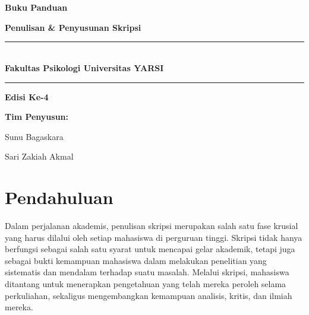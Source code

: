 \documentclass[
  indonesian,
  letterpaper,
  DIV=11,
  numbers=noendperiod]{scrreprt}
\author{}
\date{}
\renewcommand*\contentsname{Daftar Isi}
\newcommand\contentsname{Daftar Isi}
\begin{document}
\renewcommand*\contentsname{Daftar Isi}
{
\hypersetup{linkcolor=}
\setcounter{tocdepth}{2}
\tableofcontents
}


\chapter{}\label{section}


\chapter{}\label{section-1}

\begin{titlepage}
\centering
\vspace*{2.5cm}

{\fontsize{22pt}{26pt}\selectfont\bfseries\color{titleaccent} Buku Panduan\\[2mm]}
{\fontsize{18pt}{22pt}\selectfont\bfseries Penulisan \& Penyusunan Skripsi\par}

\vspace{1.4cm}
\rule{\linewidth}{0.5pt}\\[-1pt]
{\large \textbf{Fakultas Psikologi Universitas YARSI}}\par
\rule{\linewidth}{0.5pt}

\vspace{1.6cm}
{\large \textbf{Edisi Ke-4}\par}

\vfill

{\large \textbf{Tim Penyusun:}}\par
{\large Sunu Bagaskara\par}
{\large Sari Zakiah Akmal\par}

\vspace*{1.5cm}
\end{titlepage}


\chapter*{Pendahuluan}\label{pendahuluan}


Dalam perjalanan akademis, penulisan skripsi merupakan salah satu fase
krusial yang harus dilalui oleh setiap mahasiswa di perguruan tinggi.
Skripsi tidak hanya berfungsi sebagai salah satu syarat untuk mencapai
gelar akademik, tetapi juga sebagai bukti kemampuan mahasiswa dalam
melakukan penelitian yang sistematis dan mendalam terhadap suatu
masalah. Melalui skripsi, mahasiswa ditantang untuk menerapkan
pengetahuan yang telah mereka peroleh selama perkuliahan, sekaligus
mengembangkan kemampuan analisis, kritis, dan ilmiah mereka.
\end{document}
